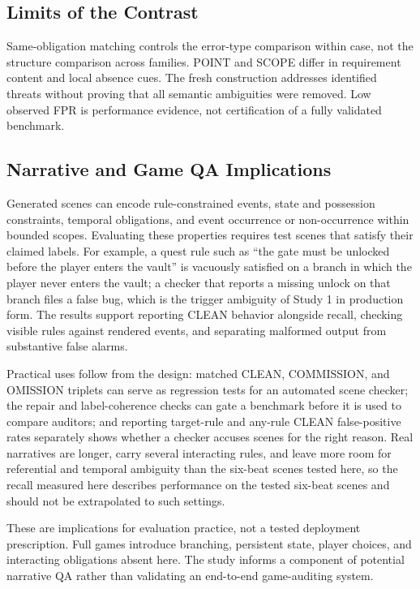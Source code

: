 \documentclass{ieeeaccess}
\begin{document}
\subsection{Limits of the Contrast}
Same-obligation matching controls the error-type comparison within case, not the structure comparison across families. POINT and SCOPE differ in requirement content and local absence cues. The fresh construction addresses identified threats without proving that all semantic ambiguities were removed. Low observed FPR is performance evidence, not certification of a fully validated benchmark.

\subsection{Narrative and Game QA Implications}
Generated scenes can encode rule-constrained events, state and possession constraints, temporal obligations, and event occurrence or non-occurrence within bounded scopes. Evaluating these properties requires test scenes that satisfy their claimed labels. For example, a quest rule such as ``the gate must be unlocked before the player enters the vault'' is vacuously satisfied on a branch in which the player never enters the vault; a checker that reports a missing unlock on that branch files a false bug, which is the trigger ambiguity of Study 1 in production form. The results support reporting CLEAN behavior alongside recall, checking visible rules against rendered events, and separating malformed output from substantive false alarms.

Practical uses follow from the design: matched CLEAN, COMMISSION, and OMISSION triplets can serve as regression tests for an automated scene checker; the repair and label-coherence checks can gate a benchmark before it is used to compare auditors; and reporting target-rule and any-rule CLEAN false-positive rates separately shows whether a checker accuses scenes for the right reason. Real narratives are longer, carry several interacting rules, and leave more room for referential and temporal ambiguity than the six-beat scenes tested here, so the recall measured here describes performance on the tested six-beat scenes and should not be extrapolated to such settings.

These are implications for evaluation practice, not a tested deployment prescription. Full games introduce branching, persistent state, player choices, and interacting obligations absent here. The study informs a component of potential narrative QA rather than validating an end-to-end game-auditing system.
\end{document}
